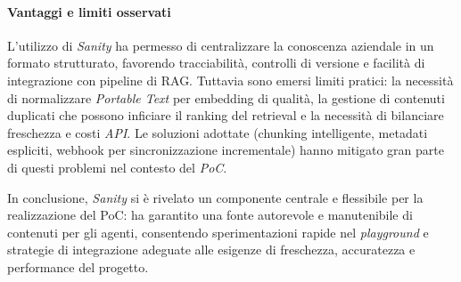 \paragraph{Vantaggi e limiti osservati} L'utilizzo di \emph{Sanity} ha permesso di centralizzare la conoscenza aziendale in un formato strutturato, 
favorendo tracciabilità, controlli di versione e facilità di integrazione con pipeline di RAG. Tuttavia sono emersi limiti pratici: la necessità di normalizzare 
\emph{Portable Text} per embedding di qualità, la gestione di contenuti duplicati che possono inficiare il ranking del retrieval e la necessità di bilanciare freschezza e costi \emph{API}. 
Le soluzioni adottate (chunking intelligente, metadati espliciti, webhook per sincronizzazione incrementale) hanno mitigato gran parte di questi problemi nel contesto del \emph{PoC}.

In conclusione, \emph{Sanity} si è rivelato un componente centrale e flessibile per la realizzazione del PoC: ha garantito una fonte autorevole e manutenibile di contenuti per gli agenti, 
consentendo sperimentazioni rapide nel \emph{playground} e strategie di integrazione adeguate alle esigenze di freschezza, accuratezza e performance del progetto.





